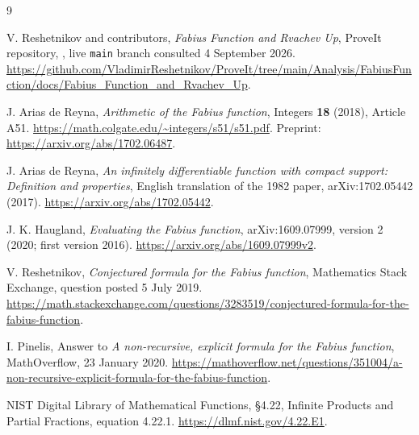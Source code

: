 \documentclass[11pt,a4paper]{article}
\numberwithin{equation}{section}
\theoremstyle{definition}
\theoremstyle{remark}
\begin{document}
\begin{thebibliography}{9}

V. Reshetnikov and contributors,
\emph{Fabius Function and Rvachev Up},
ProveIt repository, ,
live \texttt{main} branch consulted 4 September 2026.
\url{https://github.com/VladimirReshetnikov/ProveIt/tree/main/Analysis/FabiusFunction/docs/Fabius_Function_and_Rvachev_Up}.

J. Arias de Reyna,
\emph{Arithmetic of the Fabius function},
Integers \textbf{18} (2018), Article A51.
\url{https://math.colgate.edu/~integers/s51/s51.pdf}.
Preprint: \url{https://arxiv.org/abs/1702.06487}.

J. Arias de Reyna,
\emph{An infinitely differentiable function with compact support: Definition and properties},
English translation of the 1982 paper, arXiv:1702.05442 (2017).
\url{https://arxiv.org/abs/1702.05442}.

J. K. Haugland,
\emph{Evaluating the Fabius function},
arXiv:1609.07999, version 2 (2020; first version 2016).
\url{https://arxiv.org/abs/1609.07999v2}.

V. Reshetnikov,
\emph{Conjectured formula for the Fabius function},
Mathematics Stack Exchange, question posted 5 July 2019.
\url{https://math.stackexchange.com/questions/3283519/conjectured-formula-for-the-fabius-function}.

I. Pinelis,
Answer to \emph{A non-recursive, explicit formula for the Fabius function},
MathOverflow, 23 January 2020.
\url{https://mathoverflow.net/questions/351004/a-non-recursive-explicit-formula-for-the-fabius-function}.

NIST Digital Library of Mathematical Functions,
\S4.22, Infinite Products and Partial Fractions, equation 4.22.1.
\url{https://dlmf.nist.gov/4.22.E1}.

\end{thebibliography}
\end{document}
